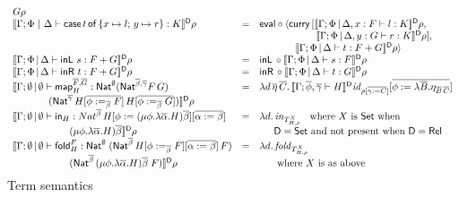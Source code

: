 \documentclass[runningheads]{llncs}
\newcommand{\set}{\mathsf{Set}}
\renewcommand{\id}{\mathit{id}}
\newcommand{\map}{\mathsf{map}}
\newcommand{\fold}{\mathsf{fold}}
\renewcommand{\id}{\mathit{id}}
\newcommand{\inl}{\mathsf{inL}\,}
\newcommand{\inr}{\mathsf{inR}\,}
\begin{document}
\begin{figure}[t]
\begin{adjustbox}{varwidth=6in, max width=5.3in, fbox, center}
\[\begin{array}{lll}
{  G} \rho\\
\dsem{\Gamma;\Phi~|~\Delta \vdash \cse{t}{x \mapsto l}{y \mapsto r} :
  K}\rho & = & \eval \circ \langle \curry \,[\dsem{\Gamma;\Phi
    \,|\, \Delta, x : F \vdash l : K}\rho,\\
   & & \hspace*{0.79in} \dsem{\Gamma;\Phi \,|\, \Delta, y
    : G \vdash r : K}\rho],\\
   & &  \hspace*{0.5in} \dsem{\Gamma;\Phi \,|\, \Delta \vdash t :
  F + G} \rho\rangle\\   
\dsem{\Gamma;\Phi \,|\, \Delta \vdash \inl \,s: F + G} \rho& = &
\inl \circ \dsem{\Gamma;\Phi \,|\, \Delta \vdash s: F}\rho\\
\dsem{\Gamma;\Phi \,|\, \Delta \vdash \inr \,t: F + G}\rho & = & 
\inr \circ \dsem{\Gamma;\Phi \,|\, \Delta \vdash t : G}\rho\\
\llbracket \Gamma;\emptyset \,|\, \emptyset \vdash \map^{\ol{F},\ol{G}}_H
  : \Nat^\emptyset (\Nat^{\ol\beta,\ol\gamma} F\,G)
& = & \lambda d\, \ol\eta\,\ol{C}.\,
\dsem{\Gamma; \ol{\phi},\ol{\gamma}\vdash H}\id_{\rho[\ol{\gamma:=
      C}]}[\ol{\phi := \lambda \ol B. \eta_{\ol B\, \ol C}}]\\ 
\hspace*{0.5in}
  (\Nat^{\ol{\gamma}}\,H[\ol{\phi :=_{\ol{\beta}} F}]\,H[\ol{\phi
      :=_{\ol{\beta}} G}]) \rrbracket^{\mathsf D} \rho & &\\
\llbracket \Gamma;\emptyset \,|\, \emptyset \vdash \tin_H :
Nat^{\ol{\beta}} \, H[\phi := (\mu \phi.\lambda {\overline
    \alpha}.H){\overline \beta}][\ol{\alpha := \beta}] & = &
\lambda d.\,\mathit{in}_{{T}^X_{H,\rho}} \;\;\mbox{ where } X \mbox{
  is } \set \mbox{ when } \\  
\hspace*{0.79in}(\mu \phi.\lambda {\overline \alpha}.H){\overline
  \beta} \rrbracket^{\mathsf{D}} \rho & & \hspace*{0.2in}  
\mathsf{D} = \set \mbox{ and not present when }
\mathsf{D} = \rel\\  
\llbracket \Gamma;\emptyset \,|\, \emptyset \vdash
  \fold^F_H : \Nat^\emptyset\;(\Nat^{\ol{\beta}}\,H[\phi
    :=_{\ol{\beta}} F][\ol{\alpha := \beta}]\,F) & = &  
\lambda d.\,
\mathit{fold}_{T^X_{H,\rho}} \\ 
\hspace*{0.79in}(\Nat^{{\ol{\beta}} }\,(\mu
  \phi.\lambda \overline \alpha.H)\overline \beta\;F)
\rrbracket^{\mathsf{D}} \rho & & \hspace*{0.2in} \mbox{ where } X \mbox{ is as above
}\vspace*{-0.1in} 
\end{array}\]
\caption{Term semantics}\label{fig:term-sem} 
\vspace*{-0.05in}
\end{adjustbox}\vspace*{-0.1in}
\end{figure}
\end{document}
